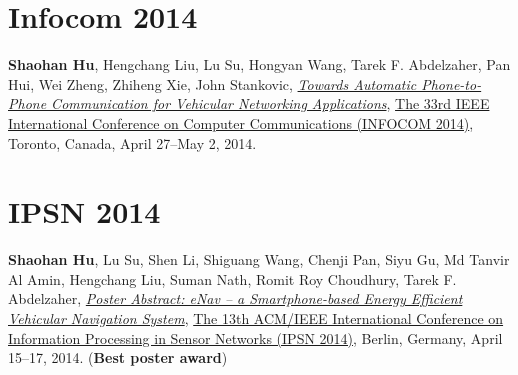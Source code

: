 
\section{\sc Infocom 2014}\hypertarget{hu2014infocom}{}
\textbf{Shaohan Hu}, Hengchang Liu, Lu Su, Hongyan Wang, Tarek F. Abdelzaher, Pan Hui, Wei Zheng, Zhiheng Xie, John Stankovic,
\href{http://ieeexplore.ieee.org/document/6848113}{\emph{Towards Automatic Phone-to-Phone Communication for Vehicular Networking Applications}},
\href{http://infocom2014.ieee-infocom.org}{\textsf{The 33rd IEEE International Conference on Computer Communications (INFOCOM 2014)}},
Toronto, Canada, April 27--May 2, 2014.


\section{\sc IPSN 2014}\hypertarget{hu2014ipsn}{}
\textbf{Shaohan Hu}, Lu Su, Shen Li, Shiguang Wang, Chenji Pan, Siyu Gu, Md Tanvir Al Amin, Hengchang Liu, Suman Nath, Romit Roy Choudhury, Tarek F. Abdelzaher,
\href{http://dl.acm.org/citation.cfm?id=2602374}{\emph{Poster Abstract: eNav -- a Smartphone-based Energy Efficient Vehicular Navigation System}},
\href{http://ipsn.acm.org/2014/}{\textsf{The 13th ACM/IEEE International Conference on Information Processing in Sensor Networks (IPSN 2014)}},
Berlin, Germany, April 15--17, 2014. (\textbf{Best poster award})

